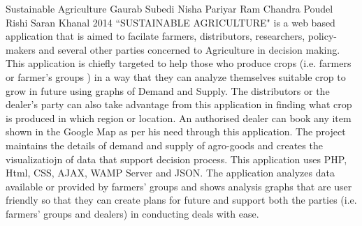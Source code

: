  \begin{conf-abstract}[]
{Sustainable Agriculture}
{ 
Gaurab Subedi 
Nisha Pariyar
Ram Chandra Poudel
Rishi Saran Khanal
}
{2014}
``SUSTAINABLE AGRICULTURE" is a web based application that is aimed to facilate farmers, distributors, researchers, policy-makers and several other parties concerned to Agriculture in decision making. This application is chiefly targeted to help those who produce crops (i.e. farmers or farmer's groups ) in a way that they can analyze themselves suitable crop to grow in future using graphs of Demand and Supply. The distributors or the dealer's party can also take advantage from this application in finding what crop is produced in which region or location. An authorised dealer can book any item shown in the Google Map as per his need through this application. The project maintains the details of demand and supply of agro-goods and creates the visualizatiojn of data that support decision process. This application uses PHP, Html, CSS, AJAX, WAMP Server and JSON. The application analyzes data available or provided by farmers' groups and shows analysis graphs that are user friendly so that they can create plans for future and support both the parties (i.e. farmers' groups and dealers) in conducting deals with ease.
  \end{conf-abstract}
